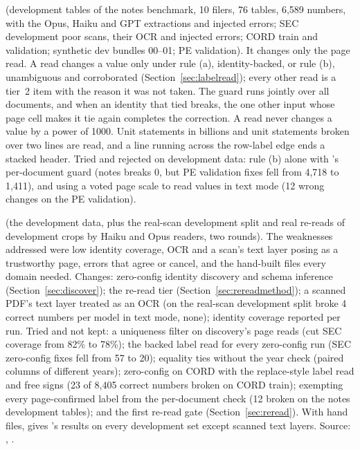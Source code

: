 \textbf{} (development tables of the notes benchmark, 10 filers, 76 tables, 6,589 numbers, with the Opus, Haiku and GPT extractions and injected errors; SEC development poor scans, their OCR and injected errors; CORD train and validation; synthetic dev bundles 00--01; PE validation). It changes only the page read. A read changes a value only under rule (a), identity-backed, or rule (b), unambiguous and corroborated (Section~\ref{sec:labelread}); every other read is a tier~2 item with the reason it was not taken. The guard runs jointly over all documents, and when an identity that tied breaks, the one other input whose page cell makes it tie again completes the correction. A read never changes a value by a power of 1000. Unit statements in billions and unit statements broken over two lines are read, and a line running across the row-label edge ends a stacked header. Tried and rejected on development data: rule (b) alone with 's per-document guard (notes breaks 0, but PE validation fixes fell from 4,718 to 1,411), and using a voted page scale to read values in text mode (12 wrong changes on the PE validation).

\textbf{} (the  development data, plus the real-scan development split and real re-reads of development crops by Haiku and Opus readers, two rounds). The weaknesses addressed were low identity coverage, OCR and a scan's text layer posing as a trustworthy page, errors that agree or cancel, and the hand-built files every domain needed. Changes: zero-config identity discovery and schema inference (Section~\ref{sec:discover}); the re-read tier (Section~\ref{sec:rereadmethod}); a scanned PDF's text layer treated as an OCR (on the real-scan development split  broke 4 correct numbers per model in text mode,  none); identity coverage reported per run. Tried and not kept: a uniqueness filter on discovery's page reads (cut SEC coverage from 82\% to 78\%); the backed label read for every zero-config run (SEC zero-config fixes fell from 57 to 20); equality ties without the year check (paired columns of different years); zero-config on CORD with the replace-style label read and free signs (23 of 8,405 correct numbers broken on CORD train); exempting every page-confirmed label from the per-document check (12 broken on the notes development tables); and the first re-read gate (Section~\ref{sec:reread}). With hand files,  gives 's results on every development set except scanned text layers. Source: , .

